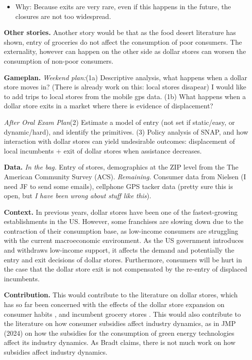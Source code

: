 \documentclass[11pt]{article}
\begin{document}
\begin{itemize}
    \item Why: Because exits are very rare, even if this happens in the future, the closures are not too widespread. 
\end{itemize}

\textbf{Other stories.} Another story would be that as the food desert literature has shown, entry of groceries do not affect the consumption of poor consumers. The externality, however can happen on the other side as dollar stores can worsen the consumption of non-poor consumers. 


\textbf{Gameplan.} \textit{Weekend plan:}(1a) Descriptive analysis, what happens when a dollar store moves in? (There is already work on this: local stores disapear) I would like to add trips to local stores from the mobile gps data. (1b) What happens when a dollar store exits in a market where there is evidence of displacement? 

\textit{After Oral Exam Plan}(2) Estimate a model of entry (not set if static/easy, or dynamic/hard), and  identify the primitives. (3) Policy analysis of SNAP, and how interaction with dollar stores can yield undesirable outcomes: displacement of local incumbents + exit of dollar stores when assistance decreases. 

\textbf{Data.} \textit{In the bag.} Entry of stores, demographics at the ZIP level from the The American Community Survey (ACS). \textit{Remaining.} Consumer data from Nielsen (I need JF to send some emails), cellphone GPS tacker data (pretty sure this is open, but \textit{I have been wrong about stuff like this}). 


\textbf{Context.} In previous years, dollar stores have been one of the fastest-growing establishments in the US. However, some franchises are slowing down due to the contraction of their consumption base, as low-income consumers are struggling with the current macroeconomic environment. As the US government introduces and withdraws low-income support, it affects the demand and potentially the entry and exit decisions of dollar stores. Furthermore, consumers will be hurt in the case that the dollar store exit is not compensated by the re-entry of displaced incumbents.


\textbf{Contribution.} This would contribute to the literature on dollar stores, which has so far been concerned with the effects of the dollar store expansion on consumer habits \cite{schneier2023buck}, and incumbent grocery stores \cite{caoui2022impact}.  This would also contribute to the literature on how consumer subsidies affect industry dynamics, as in \citeauthor{bradt2023policy} JMP (2024) on how the subsidies for the consumption of green energy technologies affect its industry dynamics. As Bradt claims, there is not much work on how subsidies affect industry dynamics. 
\end{document}

